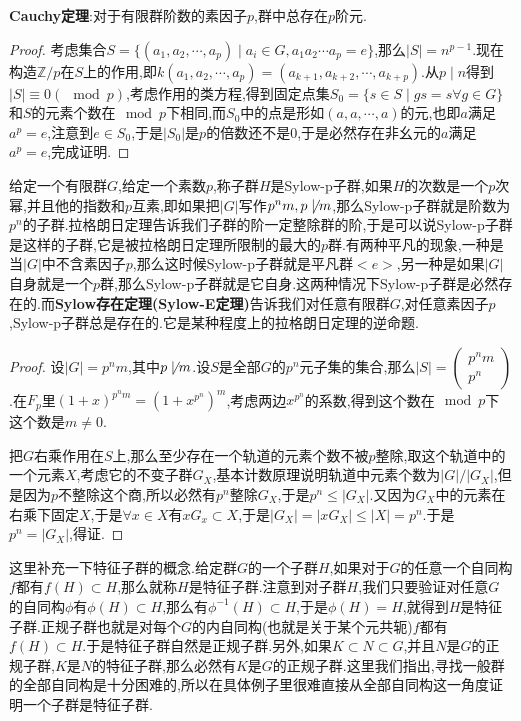 \textbf{Cauchy定理}:对于有限群阶数的素因子$p$,群中总存在$p$阶元.
\begin{proof}
	
	考虑集合$S=\{(a_1,a_2,\cdots,a_p)\mid a_i\in G,a_1a_2\cdots a_p=e\}$,那么$|S|=n^{p-1}$.现在构造$\mathbb{Z}/p$在$S$上的作用,即$k(a_1,a_2,\cdots,a_p)=(a_{k+1},a_{k+2},\cdots,a_{k+p})$.从$p\mid n$得到$|S|\equiv0(\mod p)$,考虑作用的类方程,得到固定点集$S_0=\{s\in S\mid gs=s\forall g\in G\}$和$S$的元素个数在$\mod p$下相同,而$S_0$中的点是形如$(a,a,\cdots,a)$的元,也即$a$满足$a^p=e$,注意到$e\in S_0$,于是$|S_0|$是$p$的倍数还不是0,于是必然存在非幺元的$a$满足$a^p=e$,完成证明.
\end{proof}

给定一个有限群$G$,给定一个素数$p$,称子群$H$是Sylow-p子群,如果$H$的次数是一个$p$次幂,并且他的指数和$p$互素,即如果把$|G|$写作$p^nm,p\not\mid m$,那么Sylow-p子群就是阶数为$p^n$的子群.拉格朗日定理告诉我们子群的阶一定整除群的阶,于是可以说Sylow-p子群是这样的子群,它是被拉格朗日定理所限制的最大的$p$群.有两种平凡的现象,一种是当$|G|$中不含素因子$p$,那么这时候Sylow-p子群就是平凡群$<e>$,另一种是如果$|G|$自身就是一个$p$群,那么Sylow-p子群就是它自身.这两种情况下Sylow-p子群是必然存在的.而\textbf{Sylow存在定理(Sylow-E定理)}告诉我们对任意有限群$G$,对任意素因子$p$,Sylow-p子群总是存在的.它是某种程度上的拉格朗日定理的逆命题.
\begin{proof}
	
	设$|G|=p^nm$,其中$p\not\mid m$.设$S$是全部$G$的$p^n$元子集的集合,那么$|S|=\left(\begin{array}{c}
	p^nm\\
	p^n\end{array}\right)$.在$F_p$里$(1+x)^{p^nm}=(1+x^{p^n})^m$,考虑两边$x^{p^n}$的系数,得到这个数在$\mod p$下这个数是$m\not=0$.
	
	把$G$右乘作用在$S$上,那么至少存在一个轨道的元素个数不被$p$整除,取这个轨道中的一个元素$X$,考虑它的不变子群$G_X$,基本计数原理说明轨道中元素个数为$|G|/|G_X|$,但是因为$p$不整除这个商,所以必然有$p^n$整除$G_X$,于是$p^n\le|G_X|$.又因为$G_X$中的元素在右乘下固定$X$,于是$\forall x\in X$有$xG_x\subset X$,于是$|G_X|=|xG_X|\le |X|=p^n$.于是$p^n=|G_X|$,得证.
\end{proof}

这里补充一下特征子群的概念.给定群$G$的一个子群$H$,如果对于$G$的任意一个自同构$f$都有$f(H)\subset H$,那么就称$H$是特征子群.注意到对子群$H$,我们只要验证对任意$G$的自同构$\phi$有$\phi(H)\subset H$,那么有$\phi^ {-1}(H)\subset H$,于是$\phi(H)=H$,就得到$H$是特征子群.正规子群也就是对每个$G$的内自同构(也就是关于某个元共轭)$f$都有$f(H)\subset H$.于是特征子群自然是正规子群.另外,如果$K\subset N\subset G$,并且$N$是$G$的正规子群,$K$是$N$的特征子群,那么必然有$K$是$G$的正规子群.这里我们指出,寻找一般群的全部自同构是十分困难的,所以在具体例子里很难直接从全部自同构这一角度证明一个子群是特征子群.

